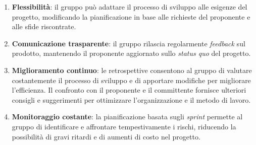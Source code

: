 \begin{enumerate}
	\item \textbf{Flessibilità}: il gruppo può adattare il processo di sviluppo 
			alle esigenze del progetto, modificando la pianificazione in base alle 
			richieste del proponente e alle sfide riscontrate.

	\item \textbf{Comunicazione trasparente}: il gruppo rilascia regolarmente 
			\textit{feedback} sul prodotto, mantenendo il proponente aggiornato sullo 
			\textit{status quo} del progetto. 

	\item \textbf{Miglioramento continuo}: le retrospettive consentono al gruppo 
			di valutare costantemente il processo di sviluppo e di apportare modifiche 
			per migliorare l'efficienza. 
			Il confronto con il proponente e il committente fornisce ulteriori consigli 
			e suggerimenti per ottimizzare l'organizzazione e il metodo di lavoro.

	\item \textbf{Monitoraggio costante}: la pianificazione basata sugli \textit{sprint} 
			permette al gruppo di identificare e affrontare tempestivamente i rischi, 
			riducendo la possibilità di gravi ritardi e di aumenti di costo nel progetto.
\end{enumerate}
